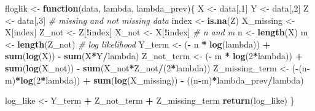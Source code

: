 \documentclass[
]{article}
\newenvironment{Shaded}{\begin{snugshade}}{\end{snugshade}}
\newcommand{\CommentTok}[1]{\textcolor[rgb]{0.56,0.35,0.01}{\textit{#1}}}
\newcommand{\ControlFlowTok}[1]{\textcolor[rgb]{0.13,0.29,0.53}{\textbf{#1}}}
\newcommand{\DecValTok}[1]{\textcolor[rgb]{0.00,0.00,0.81}{#1}}
\newcommand{\KeywordTok}[1]{\textcolor[rgb]{0.13,0.29,0.53}{\textbf{#1}}}
\newcommand{\NormalTok}[1]{#1}
\newcommand{\OperatorTok}[1]{\textcolor[rgb]{0.81,0.36,0.00}{\textbf{#1}}}
\newcommand{\StringTok}[1]{\textcolor[rgb]{0.31,0.60,0.02}{#1}}
\begin{document}
\begin{Shaded}
\begin{Highlighting}[]
{\NormalTok{floglik <-}\StringTok{ }\ControlFlowTok{function}\NormalTok{(data, lambda, lambda_prev)\{}
\NormalTok{  X <-}\StringTok{ }\NormalTok{data[,}\DecValTok{1}\NormalTok{]}
\NormalTok{  Y <-}\StringTok{ }\NormalTok{data[,}\DecValTok{2}\NormalTok{]}
\NormalTok{  Z <-}\StringTok{ }\NormalTok{data[,}\DecValTok{3}\NormalTok{]}
  \CommentTok{# missing and not missing data}
\NormalTok{  index <-}\StringTok{ }\KeywordTok{is.na}\NormalTok{(Z)}
\NormalTok{  X_missing <-}\StringTok{ }\NormalTok{X[index]}
\NormalTok{  Z_not <-}\StringTok{ }\NormalTok{Z[}\OperatorTok{!}\NormalTok{index]}
\NormalTok{  X_not <-}\StringTok{ }\NormalTok{X[}\OperatorTok{!}\NormalTok{index]}
  \CommentTok{# n and m}
\NormalTok{  n <-}\StringTok{ }\KeywordTok{length}\NormalTok{(X)}
\NormalTok{  m <-}\StringTok{ }\KeywordTok{length}\NormalTok{(Z_not)}
  \CommentTok{# log likelihood}
\NormalTok{  Y_term <-}\StringTok{ }\NormalTok{(}\OperatorTok{-}\StringTok{ }\NormalTok{n }\OperatorTok{*}\StringTok{ }\KeywordTok{log}\NormalTok{(lambda)) }\OperatorTok{+}\StringTok{ }\KeywordTok{sum}\NormalTok{(}\KeywordTok{log}\NormalTok{(X)) }\OperatorTok{-}\StringTok{ }\KeywordTok{sum}\NormalTok{(X}\OperatorTok{*}\NormalTok{Y}\OperatorTok{/}\NormalTok{lambda)}
\NormalTok{  Z_not_term <-}\StringTok{ }\NormalTok{(}\OperatorTok{-}\StringTok{ }\NormalTok{m }\OperatorTok{*}\StringTok{ }\KeywordTok{log}\NormalTok{(}\DecValTok{2}\OperatorTok{*}\NormalTok{lambda)) }\OperatorTok{+}\StringTok{ }\KeywordTok{sum}\NormalTok{(}\KeywordTok{log}\NormalTok{(X_not)) }\OperatorTok{-}\StringTok{ }\KeywordTok{sum}\NormalTok{(X_not}\OperatorTok{*}\NormalTok{Z_not}\OperatorTok{/}\NormalTok{(}\DecValTok{2}\OperatorTok{*}\NormalTok{lambda))}
\NormalTok{  Z_missing_term <-}\StringTok{ }\NormalTok{(}\OperatorTok{-}\NormalTok{(n}\OperatorTok{-}\NormalTok{m)}\OperatorTok{*}\KeywordTok{log}\NormalTok{(}\DecValTok{2}\OperatorTok{*}\NormalTok{lambda)) }\OperatorTok{+}\StringTok{ }\KeywordTok{sum}\NormalTok{(}\KeywordTok{log}\NormalTok{(X_missing)) }\OperatorTok{-}\StringTok{ }\NormalTok{((n}\OperatorTok{-}\NormalTok{m)}\OperatorTok{*}\NormalTok{lambda_prev}\OperatorTok{/}\NormalTok{lambda)}
  
\NormalTok{  log_like <-}\StringTok{ }\NormalTok{Y_term }\OperatorTok{+}\StringTok{ }\NormalTok{Z_not_term }\OperatorTok{+}\StringTok{ }\NormalTok{Z_missing_term}
  \KeywordTok{return}\NormalTok{(log_like)}
\NormalTok{\}}

}
\end{Highlighting}
\end{Shaded}
\end{document}
